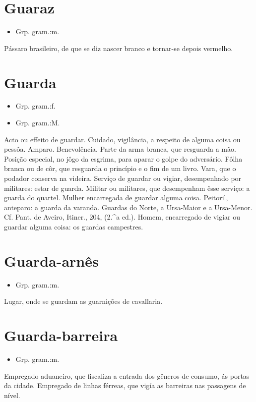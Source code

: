 \section{Guaraz}
\begin{itemize}
\item {Grp. gram.:m.}
\end{itemize}
Pássaro brasileiro, de que se diz nascer branco e tornar-se depois vermelho.
\section{Guarda}
\begin{itemize}
\item {Grp. gram.:f.}
\end{itemize}
\begin{itemize}
\item {Grp. gram.:M.}
\end{itemize}
Acto ou effeito de guardar.
Cuidado, vigilância, a respeito de alguma coisa ou pessôa.
Amparo.
Benevolência.
Parte da arma branca, que resguarda a mão.
Posição especial, no jôgo da esgrima, para aparar o golpe do adversário.
Fôlha branca ou de côr, que resguarda o princípio e o fim de um livro.
Vara, que o podador conserva na videira.
Serviço de guardar ou vigiar, desempenhado por militares: \textunderscore estar de guarda\textunderscore .
Militar ou militares, que desempenham êsse serviço: \textunderscore a guarda do quartel\textunderscore .
Mulher encarregada de guardar alguma coisa.
Peitoril, anteparo: \textunderscore a guarda da varanda\textunderscore .
\textunderscore Guardas do Norte\textunderscore , a Ursa-Maior e a Ursa-Menor. Cf. Pant. de Aveiro, \textunderscore Itiner.\textunderscore , 204, (2.^a ed.).
Homem, encarregado de vigiar ou guardar alguma coisa: \textunderscore os guardas campestres\textunderscore .
\section{Guarda-arnês}
\begin{itemize}
\item {Grp. gram.:m.}
\end{itemize}
Lugar, onde se guardam as guarnições de cavallaria.
\section{Guarda-barreira}
\begin{itemize}
\item {Grp. gram.:m.}
\end{itemize}
Empregado aduaneiro, que fiscaliza a entrada dos gêneros de consumo, ás portas da cidade.
Empregado de linhas férreas, que vigía as barreiras nas passagens de nível.
